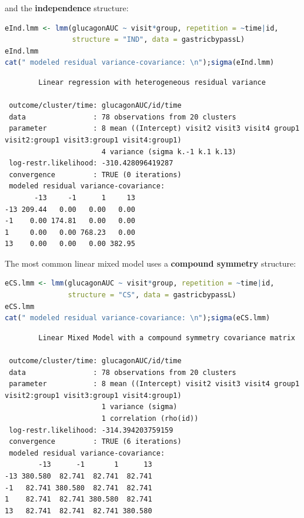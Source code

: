 \documentclass[12pt]{article}
\begin{document}
and the \textbf{independence} structure:
\begin{lstlisting}[language=r,numbers=none]
eInd.lmm <- lmm(glucagonAUC ~ visit*group, repetition = ~time|id, 
                structure = "IND", data = gastricbypassL)
eInd.lmm
cat(" modeled residual variance-covariance: \n");sigma(eInd.lmm)
\end{lstlisting}

\label{}
\begin{verbatim}
		Linear regression with heterogeneous residual variance 

 outcome/cluster/time: glucagonAUC/id/time 
 data                : 78 observations from 20 clusters 
 parameter           : 8 mean ((Intercept) visit2 visit3 visit4 group1 visit2:group1 visit3:group1 visit4:group1) 
                       4 variance (sigma k.-1 k.1 k.13) 
 log-restr.likelihood: -310.428096419287 
 convergence         : TRUE (0 iterations)
 modeled residual variance-covariance: 
       -13     -1      1     13
-13 209.44   0.00   0.00   0.00
-1    0.00 174.81   0.00   0.00
1     0.00   0.00 768.23   0.00
13    0.00   0.00   0.00 382.95
\end{verbatim}

\clearpage

The most common linear mixed model uses a \textbf{compound symmetry} structure:
\begin{lstlisting}[language=r,numbers=none]
eCS.lmm <- lmm(glucagonAUC ~ visit*group, repetition = ~time|id,
               structure = "CS", data = gastricbypassL)
eCS.lmm
cat(" modeled residual variance-covariance: \n");sigma(eCS.lmm)
\end{lstlisting}

\label{}
\begin{verbatim}
		Linear Mixed Model with a compound symmetry covariance matrix 

 outcome/cluster/time: glucagonAUC/id/time 
 data                : 78 observations from 20 clusters 
 parameter           : 8 mean ((Intercept) visit2 visit3 visit4 group1 visit2:group1 visit3:group1 visit4:group1) 
                       1 variance (sigma) 
                       1 correlation (rho(id)) 
 log-restr.likelihood: -314.394203759159 
 convergence         : TRUE (6 iterations)
 modeled residual variance-covariance: 
        -13      -1       1      13
-13 380.580  82.741  82.741  82.741
-1   82.741 380.580  82.741  82.741
1    82.741  82.741 380.580  82.741
13   82.741  82.741  82.741 380.580
\end{verbatim}
\end{document}

